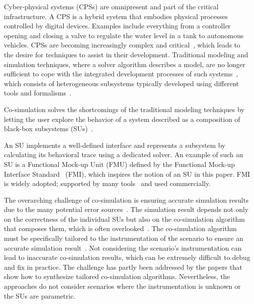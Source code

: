 Cyber-physical systems (CPSs) are omnipresent and part of the critical infrastructure.
A CPS is a hybrid system that embodies physical processes controlled by digital devices. Examples include everything from a controller opening and closing a valve to regulate the water level in a tank to autonomous vehicles.
CPSs are becoming increasingly complex and critical~\cite{4519604}, which leads to the desire for techniques to assist in their development.
Traditional modeling and simulation techniques, where a solver algorithm describes a model, are no longer sufficient to cope with the integrated development processes of such systems~\cite{FMI2014}, which consists of heterogeneous subsystems typically developed using different tools and formalisms~\cite{Paris19}. 

Co-simulation solves the shortcomings of the traditional modeling techniques by letting the user explore the behavior of a system described as a composition of black-box subsystems (SUs)~\cite{Kubler2000,Gomes2018}.

An SU implements a well-defined interface and represents a subsystem by calculating its behavioral trace using a dedicated solver.
An example of such an SU is a Functional Mock-up Unit (FMU) defined by the Functional Mock-up Interface Standard~\cite{FMI2014} (FMI), which inspires the notion of an SU in this paper. 
FMI is widely adopted; supported by many tools~\cite{Tools_FMI} and used commercially.

The overarching challenge of co-simulation is ensuring accurate simulation results due to the many potential error sources~\cite{Gomes2018}.
The simulation result depends not only on the correctness of the individual SUs but also on the co-simulation algorithm that composes them, which is often overlooked~\cite{Gomes2019,Gomes2018f,Schweizer2015c}.
The co-simulation algorithm must be specifically tailored to the instrumentation of the scenario to ensure an accurate simulation result~\cite{hansen_verification_2021,Oakes2021}.
Not considering the scenario's instrumentation can lead to inaccurate co-simulation results, which can be extremely difficult to debug and fix in practice.
The challenge has partly been addressed by the papers \cite{Gomes2019,Oakes2021,thrane2021} that show how to synthesize tailored co-simulation algorithms.
Nevertheless, the approaches do not consider scenarios where the instrumentation is unknown or the SUs are parametric.

